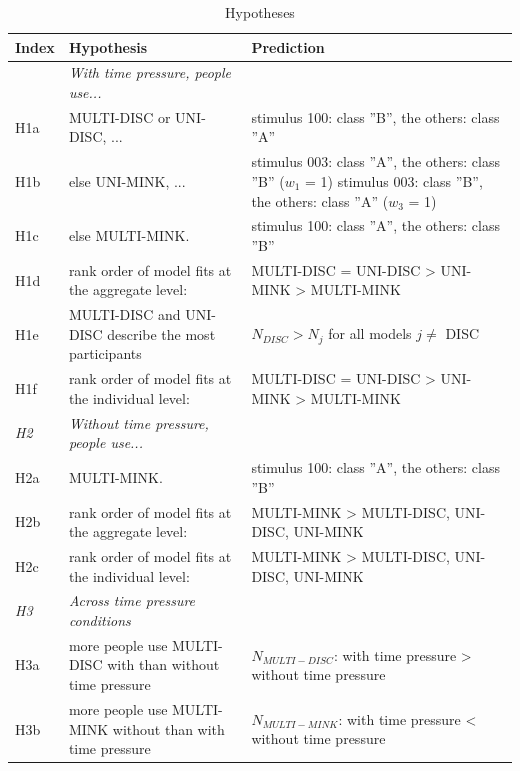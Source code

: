 \documentclass[a4paper,man,natbib]{apa6}
\begin{document}
\begin{table}
\begin{center}
\begin{threeparttable}
\caption{Hypotheses}
\label{tab:hypotheses}
\begin{tabular*}{\textwidth}{lp{115mm}p{110mm}}
\toprule
\multicolumn{1}{l}{Index} & \multicolumn{1}{l}{Hypothesis} & \multicolumn{1}{l}{Prediction}\\
\midrule
\addlinespace
\multicolumn{1}{l}{\emph{H1}} & \multicolumn{1}{l}{\emph{With time pressure, people use...}} \\
\addlinespace
H1a & MULTI-DISC or UNI-DISC, ... & stimulus 100: class ''B'', the others: class ''A''\\
\addlinespace
H1b & else UNI-MINK, ...  & stimulus 003: class ''A'', the others: class ''B'' ($w_1$ = 1) \newline stimulus 003: class ''B'', the others: class ''A'' ($w_3$ = 1)\\
\addlinespace
H1c & else MULTI-MINK. & stimulus 100: class ''A'', the others: class ''B''\\
\addlinespace
H1d & rank order of model fits at the aggregate level: & MULTI-DISC = UNI-DISC > UNI-MINK > MULTI-MINK\\
\addlinespace
H1e & MULTI-DISC and UNI-DISC describe the most participants & $N_{DISC} > N_{j}$ for all models $j \neq$ DISC\\
\addlinespace
H1f & rank order of model fits at the individual level: & MULTI-DISC = UNI-DISC > UNI-MINK > MULTI-MINK\\
\midrule
\multicolumn{1}{l}{\emph{H2}} & \multicolumn{1}{l}{\emph{Without time pressure, people use...}} \\
\addlinespace
H2a & MULTI-MINK. & stimulus 100: class ''A'', the others: class ''B''\\
\addlinespace
H2b & rank order of model fits at the aggregate level: & MULTI-MINK > {MULTI-DISC, UNI-DISC, UNI-MINK}\\
\addlinespace
H2c & rank order of model fits at the individual level: & MULTI-MINK > {MULTI-DISC, UNI-DISC, UNI-MINK}\\
\midrule
\multicolumn{1}{l}{\emph{H3}} & \multicolumn{1}{l}{\emph{Across time pressure conditions}} \\
\addlinespace
H3a & more people use MULTI-DISC with than without time pressure & $N_{MULTI-DISC}$: with time pressure > without time pressure\\
\addlinespace
H3b & more people use MULTI-MINK without than with time pressure & $N_{MULTI-MINK}$: with time pressure < without time pressure\\

\end{tabular*}
\end{threeparttable}
\end{center}
\end{table}
\end{document}
